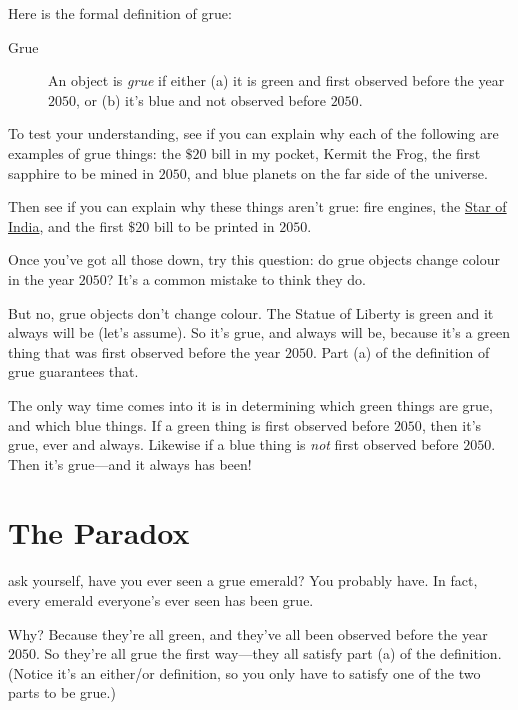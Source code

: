 \documentclass[justified]{tufte-book}
\theoremstyle{definition}
\theoremstyle{definition}
\theoremstyle{definition}
\theoremstyle{remark}
\begin{document}
Here is the formal definition of grue:

\begin{description}
\item[Grue]
An object is \emph{grue} if either (a) it is green and first observed
before the year \(2050\), or (b) it's blue and not observed before
\(2050\).
\end{description}

To test your understanding, see if you can explain why each of the
following are examples of grue things: the \(\$20\) bill in my pocket,
Kermit the Frog, the first sapphire to be mined in \(2050\), and blue
planets on the far side of the universe.

Then see if you can explain why these things aren't grue: fire engines,
the \href{https://en.wikipedia.org/wiki/Star_of_India_(gem)}{Star of
India}, and the first \(\$20\) bill to be printed in \(2050\).

Once you've got all those down, try this question: do grue objects
change colour in the year \(2050\)? It's a common mistake to think they
do.

But no, grue objects don't change colour. The Statue of Liberty is green
and it always will be (let's assume). So it's grue, and always will be,
because it's a green thing that was first observed before the year
\(2050\). Part (a) of the definition of grue guarantees that.

The only way time comes into it is in determining which green things are
grue, and which blue things. If a green thing is first observed before
\(2050\), then it's grue, ever and always. Likewise if a blue thing is
\emph{not} first observed before \(2050\). Then it's grue---and it
always has been!

\hypertarget{the-paradox}{%
\section*{The Paradox}\label{the-paradox}}

 ask yourself, have you ever seen a grue emerald? You
probably have. In fact, every emerald everyone's ever seen has been
grue.

Why? Because they're all green, and they've all been observed before the
year \(2050\). So they're all grue the first way---they all satisfy part
(a) of the definition. (Notice it's an either/or definition, so you only
have to satisfy one of the two parts to be grue.)
\end{document}
